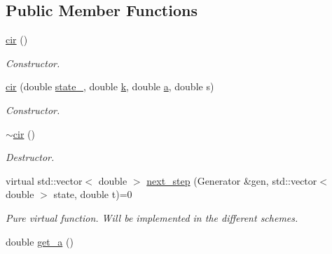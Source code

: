 \subsection*{Public Member Functions}
\begin{DoxyCompactItemize}
\item 
\hyperlink{classcir_af9a7a658975ddd029b12cd795ac04443}{cir} ()\hypertarget{classcir_af9a7a658975ddd029b12cd795ac04443}{}\label{classcir_af9a7a658975ddd029b12cd795ac04443}

\begin{DoxyCompactList}\small\item\em Constructor. \end{DoxyCompactList}\item 
\hyperlink{classcir_adbb40f0d8743587d1ed5d2bb5728e315}{cir} (double \hyperlink{classprocess_ab4d01c8ea2e9c8285134786d32ae42aa}{state\+\_}, double \hyperlink{classcir_aa5b05ff03ee8bb587ea94426a9ce704b}{k}, double \hyperlink{classcir_a358578305ea60d31c00546233304651c}{a}, double s)\hypertarget{classcir_adbb40f0d8743587d1ed5d2bb5728e315}{}\label{classcir_adbb40f0d8743587d1ed5d2bb5728e315}

\begin{DoxyCompactList}\small\item\em Constructor. \end{DoxyCompactList}\item 
\hyperlink{classcir_a6b904f45a8f19eed507d814fbc09776f}{$\sim$cir} ()\hypertarget{classcir_a6b904f45a8f19eed507d814fbc09776f}{}\label{classcir_a6b904f45a8f19eed507d814fbc09776f}

\begin{DoxyCompactList}\small\item\em Destructor. \end{DoxyCompactList}\item 
virtual std\+::vector$<$ double $>$ \hyperlink{classcir_ad3d4f7db1a4448632a6fdbada17cc651}{next\+\_\+step} (Generator \&gen, std\+::vector$<$ double $>$ state, double t)=0\hypertarget{classcir_ad3d4f7db1a4448632a6fdbada17cc651}{}\label{classcir_ad3d4f7db1a4448632a6fdbada17cc651}

\begin{DoxyCompactList}\small\item\em Pure virtual function. Will be implemented in the different schemes. \end{DoxyCompactList}\item 
double \hyperlink{classcir_a99e9faea04b897570b376e4495cdea53}{get\+\_\+a} ()\hypertarget{classcir_a99e9faea04b897570b376e4495cdea53}{}\label{classcir_a99e9faea04b897570b376e4495cdea53}


\end{DoxyCompactItemize}
